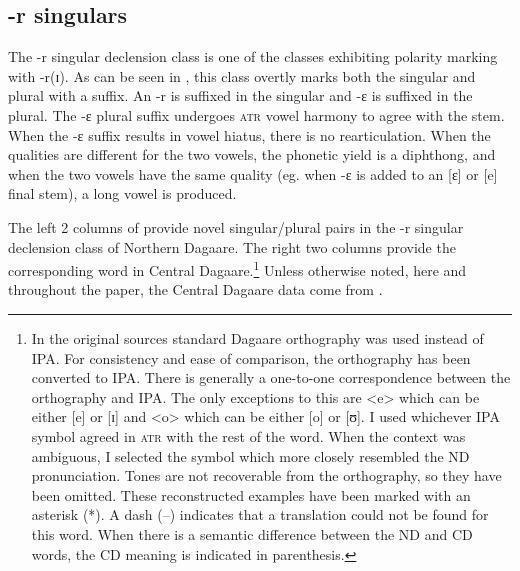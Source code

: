 \documentclass[output=paper,colorlinks,citecolor=brown,
]{langscibook}
\begin{document}
\subsection{-r singulars} \label{sec:Caragine:ePlural}

The -r singular declension class is one of the classes exhibiting polarity marking with -r(ɪ). As can be seen in , this class overtly marks both the singular and plural with a suffix. An -r is suffixed in the singular and -ɛ is suffixed in the plural. The -ɛ plural suffix undergoes \textsc{atr} vowel harmony to agree with the stem. When the -ɛ suffix results in vowel hiatus, there is no rearticulation. When the qualities are different for the two vowels, the phonetic yield is a diphthong, and when the two vowels have the same quality (eg. when -ɛ is added to an [ɛ] or [e] final stem), a long vowel is produced.

The left 2 columns of  provide novel singular/plural pairs in the -r singular declension class of Northern Dagaare. The right two columns provide the corresponding word in Central Dagaare.\footnote{In the original sources standard Dagaare orthography was used instead of IPA. For consistency and ease of comparison, the orthography has been converted to IPA. There is generally a one-to-one correspondence between the orthography and IPA. The only exceptions to this are <e> which can be either [e] or [ɪ] and <o> which can be either [o] or [ʊ]. I used whichever IPA symbol agreed in \textsc{atr} with the rest of the word. When the context was ambiguous, I selected the symbol which more closely resembled the ND pronunciation. Tones are not recoverable from the orthography, so they have been omitted. These reconstructed examples have been marked with an asterisk (*). A dash (--) indicates that a translation could not be found for this word. When there is a semantic difference between the ND and CD words, the CD meaning is indicated in parenthesis.} 
Unless otherwise noted, here and throughout the paper, the Central Dagaare data come from \citet{aliDictionary2021}. 
\end{document}
